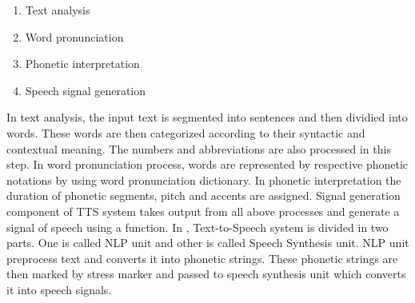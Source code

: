 \begin{enumerate}
  \item Text analysis
  \item Word pronunciation
  \item Phonetic interpretation
  \item Speech signal generation
\end{enumerate}

In text analysis, the input text is segmented into sentences and then dividied into words. These words are then categorized according to their syntactic and contextual meaning. The numbers and abbreviations are also processed in this step. In word pronunciation process, words are represented by respective phonetic notations by using word pronunciation dictionary. In phonetic interpretation the duration of phonetic segments, pitch and accents are assigned. Signal generation component of TTS system takes output from all above processes and generate a signal of speech using a function. In \cite{urdu_text_preprocessing}, Text-to-Speech system is divided in two parts. One is called NLP unit and other is called Speech Synthesis unit. NLP unit preprocess text and converts it into phonetic strings. These phonetic strings are then marked by stress marker and passed to speech synthesis unit which converts it into speech signals.